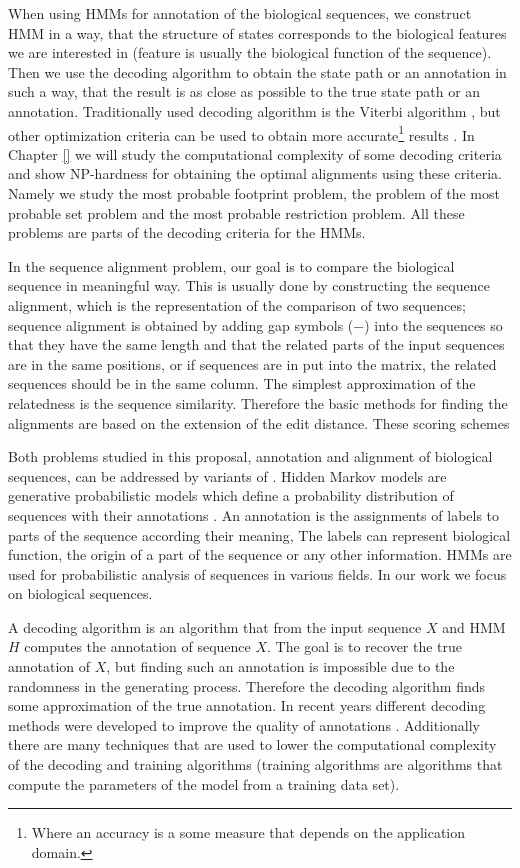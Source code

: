 When using HMMs for annotation of the biological sequences, we construct HMM in
a way, that the structure of states corresponds to the biological features we
are interested in (feature is usually the biological function of the sequence).
Then we use the decoding algorithm to obtain the state path or an annotation in
such a way, that the result is as close as possible to the true state path or
an annotation. Traditionally used decoding algorithm is the Viterbi algorithm
\cite{}, but other optimization criteria can be used to obtain more
accurate\footnote{Where an accuracy is a some measure that depends on the
application domain.} results \cite{}. In Chapter \ref{} we will study the
computational complexity of some decoding criteria and show NP-hardness for
obtaining the optimal alignments using these criteria. Namely we study the most
probable footprint problem, the problem of the most probable set problem and
the most probable restriction problem. All these problems are parts of the
decoding criteria for the HMMs.

In the sequence alignment problem, our goal is to compare the biological
sequence in meaningful way. This is usually done by constructing the sequence
alignment, which is the representation of the comparison of two sequences;
sequence alignment is obtained by adding gap symbols ($-$) into the sequences
so that they have the same length and that the related parts of the input
sequences are in the same positions, or if sequences are in put into the
matrix, the related sequences should be in the same column. The simplest
approximation of the relatedness is the sequence similarity. Therefore the
basic methods for finding the alignments are based on the extension of the edit
distance. These scoring schemes 


Both problems studied in this proposal, annotation and alignment of biological
sequences, can be addressed by variants of .  Hidden Markov models are generative probabilistic models which
define a probability distribution of sequences with their annotations
\cite{Durbin1998}. An annotation is the assignments of labels to parts of the
sequence according their meaning, The labels can represent biological function,
the origin of a part of the sequence or any other information. HMMs are used for
probabilistic analysis of sequences in various fields. In our work we focus on
biological sequences. 

A decoding algorithm is an algorithm that from the input sequence $X$ and HMM
$H$ computes the annotation of sequence $X$. The goal is to recover the true
annotation of $X$, but finding such an annotation is impossible due to the
randomness in the generating process. Therefore the decoding algorithm finds
some approximation of the true annotation.  In recent years different decoding
methods were developed to improve the quality of annotations
\cite{Gross2007,Nanasi2010,Nanasi2010mgr,Truszkowski2011}.  Additionally there
are many techniques that are used to lower the computational complexity of the
decoding and training algorithms (training algorithms are algorithms that
compute the parameters of the model from a training data set).

